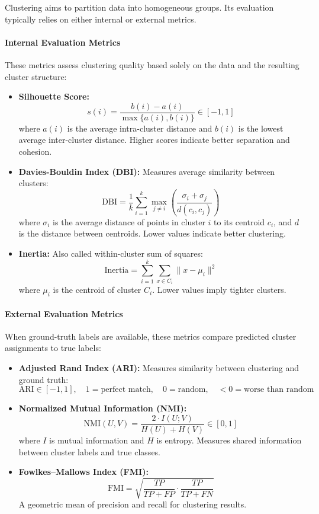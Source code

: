 \documentclass[9pt]{extarticle}
\begin{document}
Clustering aims to partition data into homogeneous groups. Its evaluation typically relies on either internal or external metrics.

\paragraph{Internal Evaluation Metrics}

These metrics assess clustering quality based solely on the data and the resulting cluster structure:
\begin{itemize}
    \item \textbf{Silhouette Score:}
    \[
    s(i) = \frac{b(i) - a(i)}{\max\{a(i), b(i)\}} \in [-1, 1]
    \]
    where $a(i)$ is the average intra-cluster distance and $b(i)$ is the lowest average inter-cluster distance. Higher scores indicate better separation and cohesion.
    
    \item \textbf{Davies-Bouldin Index (DBI):} Measures average similarity between clusters:
    \[
    \text{DBI} = \frac{1}{k} \sum_{i=1}^{k} \max_{j \ne i} \left( \frac{\sigma_i + \sigma_j}{d(c_i, c_j)} \right)
    \]
    where $\sigma_i$ is the average distance of points in cluster $i$ to its centroid $c_i$, and $d$ is the distance between centroids. Lower values indicate better clustering.
    
    \item \textbf{Inertia:} Also called within-cluster sum of squares:
    \[
    \text{Inertia} = \sum_{i=1}^{k} \sum_{x \in C_i} \|x - \mu_i\|^2
    \]
    where $\mu_i$ is the centroid of cluster $C_i$. Lower values imply tighter clusters.
\end{itemize}

\paragraph{External Evaluation Metrics}

When ground-truth labels are available, these metrics compare predicted cluster assignments to true labels:
\begin{itemize}
    \item \textbf{Adjusted Rand Index (ARI):} Measures similarity between clustering and ground truth:
    \[
    \text{ARI} \in [-1, 1], \quad 1 = \text{perfect match}, \quad 0 = \text{random}, \quad < 0 = \text{worse than random}
    \]
    
    \item \textbf{Normalized Mutual Information (NMI):}
    \[
    \text{NMI}(U, V) = \frac{2 \cdot I(U; V)}{H(U) + H(V)} \in [0, 1]
    \]
    where $I$ is mutual information and $H$ is entropy. Measures shared information between cluster labels and true classes.
    
    \item \textbf{Fowlkes–Mallows Index (FMI):}
    \[
    \text{FMI} = \sqrt{\frac{TP}{TP + FP} \cdot \frac{TP}{TP + FN}}
    \]
    A geometric mean of precision and recall for clustering results.
\end{itemize}
\end{document}
